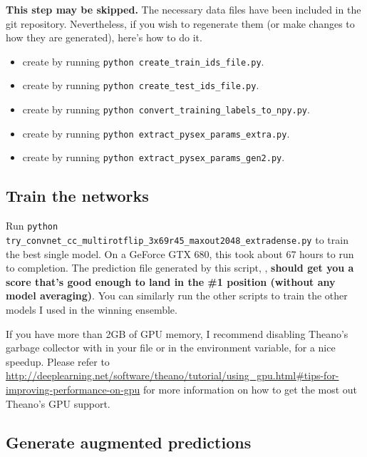 \documentclass[a4paper,10pt]{article}
\begin{document}
\textbf{This step may be skipped.} The necessary data files have been included in the git repository. Nevertheless, if you wish to regenerate them (or make changes to how they are generated), here's how to do it.

\begin{itemize}
 \item create  by running \texttt{python create\_train\_ids\_file.py}.
 \item create  by running \texttt{python create\_test\_ids\_file.py}.
 \item create  by running \texttt{python convert\_training\_labels\_to\_npy.py}.
 \item create  by running \texttt{python extract\_pysex\_params\_extra.py}.
 \item create  by running \texttt{python extract\_pysex\_params\_gen2.py}.
\end{itemize}

\subsection{Train the networks}

Run \texttt{python try\_convnet\_cc\_multirotflip\_3x69r45\_maxout2048\_extradense.py} to train the best single model. On a GeForce GTX 680, this took about 67 hours to run to completion. The prediction file generated by this script, , \textbf{should get you a score that's good enough to land in the \#1 position (without any model averaging)}. You can similarly run the other  scripts to train the other models I used in the winning ensemble.

If you have more than 2GB of GPU memory, I recommend disabling Theano's garbage collector with  in your  file or in the  environment variable, for a nice speedup. Please refer to \url{http://deeplearning.net/software/theano/tutorial/using_gpu.html#tips-for-improving-performance-on-gpu} for more information on how to get the most out Theano's GPU support.

\subsection{Generate augmented predictions}
\end{document}
